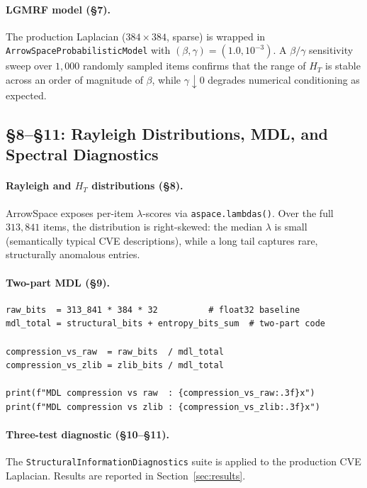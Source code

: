 \documentclass[12pt,a4paper]{article}
\theoremstyle{plain}
\theoremstyle{definition}
\theoremstyle{remark}
\newcommand{\1}{\mathbf{1}}
\begin{document}
	\paragraph{LGMRF model (§7).}
	The production Laplacian ($384\times 384$, sparse) is wrapped in
	\texttt{ArrowSpaceProbabilisticModel} with $(\beta,\gamma)=(1.0,
	10^{-3})$.
	A $\beta/\gamma$ sensitivity sweep over $1{,}000$ randomly sampled
	items confirms that the range of $H_T$ is stable across an order of
	magnitude of $\beta$, while $\gamma\downarrow 0$ degrades numerical
	conditioning as expected.
	
	\subsection{§8--§11: Rayleigh Distributions, MDL, and Spectral Diagnostics}
	
	\paragraph{Rayleigh and $H_T$ distributions (§8).}
	ArrowSpace exposes per-item $\lambda$-scores via \texttt{aspace.lambdas()}.
	Over the full $313{,}841$ items, the distribution is right-skewed: the
	median $\lambda$ is small (semantically typical CVE descriptions), while
	a long tail captures rare, structurally anomalous entries.
	
	\paragraph{Two-part MDL (§9).}
	
	\begin{lstlisting}[caption={Two-part MDL and baselines for CVE},
		label={lst:mdlcve}]
raw_bits  = 313_841 * 384 * 32          # float32 baseline
mdl_total = structural_bits + entropy_bits_sum  # two-part code

compression_vs_raw  = raw_bits  / mdl_total
compression_vs_zlib = zlib_bits / mdl_total

print(f"MDL compression vs raw  : {compression_vs_raw:.3f}x")
print(f"MDL compression vs zlib : {compression_vs_zlib:.3f}x")
	\end{lstlisting}
	
	\paragraph{Three-test diagnostic (§10--§11).}
	The \texttt{StructuralInformationDiagnostics} suite is applied to the
	production CVE Laplacian.
	Results are reported in Section~\ref{sec:results}.
	
\end{document}
